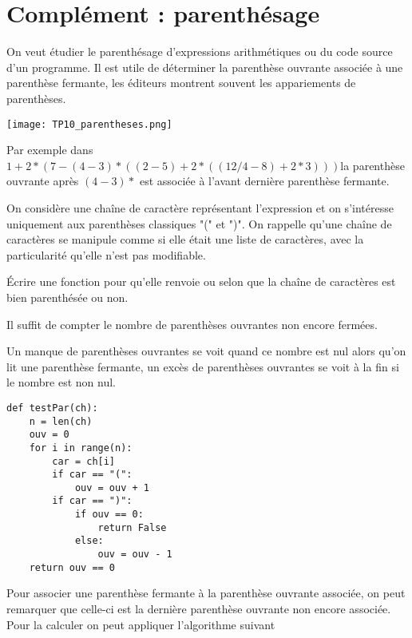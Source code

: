 \section{Complément : parenthésage} 
On veut étudier le parenthésage d'expressions arithmétiques ou du code source d'un programme. Il est utile de déterminer la parenthèse ouvrante associée à une parenthèse fermante, les éditeurs montrent souvent les appariements  de parenthèses.
\begin{center}
\texttt{[image: TP10\_parentheses.png]}
\end{center}

Par exemple dans $1 + 2*(7-(4-3)*((2-5)+2*((12/4-8)+2*3)))$la parenthèse ouvrante après $(4-3)*$ est associée à l'avant dernière parenthèse fermante.

On considère une chaîne de caractère représentant l'expression et on s'intéresse uniquement aux parenthèses classiques "(" et ")". On rappelle qu'une chaîne de caractères se manipule comme si elle était une liste de caractères, avec la particularité qu'elle n'est pas modifiable.
\begin{Exercise}[title = {Test de parenthésage}]\it

Écrire une fonction  pour qu'elle renvoie  ou  selon que la chaîne de caractères est bien parenthésée ou non.
\end{Exercise} 
\begin{Answer}

Il suffit de compter le nombre de parenthèses ouvrantes non encore fermées.

Un manque de parenthèses ouvrantes se voit quand ce nombre est nul alors qu'on lit une parenthèse fermante, un excès de parenthèses ouvrantes se voit à la fin si le nombre est non nul.
\begin{lstlisting}
def testPar(ch):
    n = len(ch)
    ouv = 0
    for i in range(n):
        car = ch[i]
        if car == "(":
            ouv = ouv + 1
        if car == ")":
            if ouv == 0:
                return False
            else:
                ouv = ouv - 1
    return ouv == 0
\end{lstlisting}
\end{Answer}
Pour associer une parenthèse fermante à la parenthèse ouvrante associée, on peut remarquer que celle-ci est la dernière parenthèse ouvrante non encore associée. Pour la calculer on peut appliquer l'algorithme suivant

